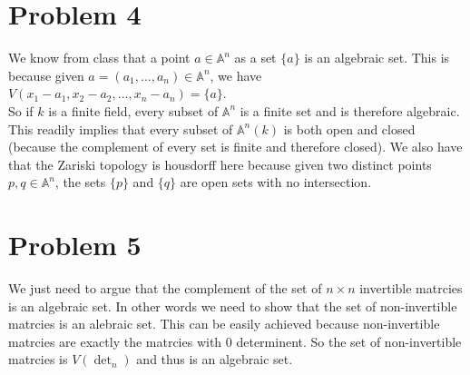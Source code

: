 \documentclass[12pt]{article}
\begin{document}
\section*{Problem 4}
We know from class that a point $a \in \mathbb{A}^n$ as a set $\{a\}$ is an algebraic set. This is because given 
$a=(a_1,...,a_n) \in \mathbb{A}^n$, we have 
$V(x_1-a_1,x_2-a_2,...,x_n-a_n)=\{a\}$.
\\
So if $k$ is a finite field, every subset of $\mathbb{A}^n$ is a finite set and is therefore algebraic. This readily implies that every subset of $\mathbb{A}^n(k)$ is both open and closed (because the complement of every set is finite and therefore closed). We also have that the Zariski topology is housdorff here because given two distinct points $p,q \in \mathbb{A}^n$, the sets $\{p\}$ and $\{q\}$ are open sets with no intersection.
\section*{Problem 5}
We just need to argue that the complement of the set of $n \times n$ invertible matrcies is an algebraic set. In other words we need to show that the set of non-invertible matrcies is an alebraic set. This can be easily achieved because non-invertible matrcies are exactly the matrcies with 0 determinent. So the set of non-invertible matrcies is $V(\det_n)$ and thus is an algebraic set.

\clearpage
\end{document}
